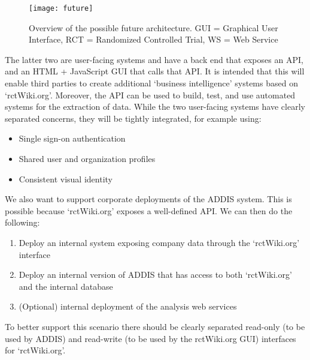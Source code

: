 \documentclass[a4paper]{article}
\begin{document}
\begin{figure}[h]
\centering
\texttt{[image: future]}
\caption{Overview of the possible future architecture. GUI = Graphical User Interface, RCT = Randomized Controlled Trial, WS = Web Service}
\end{figure}

The latter two are user-facing systems and have a back end that exposes an API, and an HTML + JavaScript GUI that calls that API.
It is intended that this will enable third parties to create additional `business intelligence' systems based on `rctWiki.org'.
Moreover, the API can be used to build, test, and use automated systems for the extraction of data.
While the two user-facing systems have clearly separated concerns, they will be tightly integrated, for example using:
\begin{itemize}
\item Single sign-on authentication
\item Shared user and organization profiles
\item Consistent visual identity
\end{itemize}

We also want to support corporate deployments of the ADDIS system. This is possible because `rctWiki.org' exposes a well-defined API. We can then do the following:
\begin{enumerate}
\item Deploy an internal system exposing company data through the `rctWiki.org' interface
\item Deploy an internal version of ADDIS that has access to both `rctWiki.org' and the internal database
\item (Optional) internal deployment of the analysis web services
\end{enumerate}
To better support this scenario there should be clearly separated read-only (to be used by ADDIS) and read-write (to be used by the rctWiki.org GUI) interfaces for `rctWiki.org'.
\end{document}
